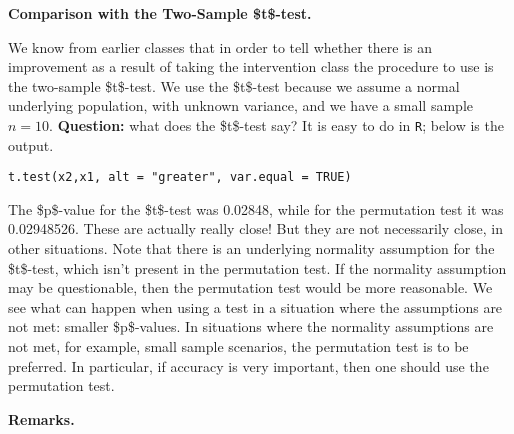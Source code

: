 \documentclass[11pt,english]{scrbook}
\begin{document}
\textbf{Comparison with the Two-Sample \$t\$-test.}

We know from earlier classes that in order to tell whether there is an improvement as a result of taking the intervention class the procedure to use is the two-sample \$t\$-test. We use the \$t\$-test because we assume a normal underlying population, with unknown variance, and we have a small sample \(n=10\). \textbf{Question:} what does the \$t\$-test say? It is easy to do in \texttt{R}; below is the output.

\begin{verbatim}
t.test(x2,x1, alt = "greater", var.equal = TRUE)
\end{verbatim}


The \$p\$-value for the \$t\$-test was 0.02848, while for the permutation test it was 0.02948526. These are actually really close! But they are not necessarily close, in other situations. Note that there is an underlying normality assumption for the \$t\$-test, which isn't present in the permutation test. If the normality assumption may be questionable, then the permutation test would be more reasonable. We see what can happen when using a test in a situation where the assumptions are not met: smaller \$p\$-values. In situations where the normality assumptions are not met, for example, small sample scenarios, the permutation test is to be preferred. In particular, if accuracy is very important, then one should use the permutation test.


\textbf{Remarks.}
\end{document}
